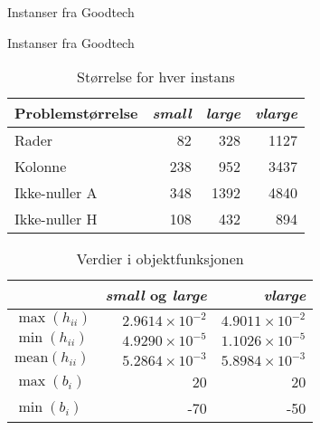 \documentclass{beamer}
\begin{document}
\begin{frame}{Instanser fra Goodtech}

\end{frame}



\begin{frame}{Instanser fra Goodtech}
\begin{table}[ht!]
    \centering
    \caption{Størrelse for hver instans}
    \begin{tabular}{lrrr}
    Problemstørrelse & \textit{small} & \textit{large} & \textit{vlarge} \\\hline
    Rader        & 82             & 328            & 1127 \\
    Kolonne      & 238            & 952            & 3437 \\
    Ikke-nuller A & 348            & 1392           & 4840 \\
    Ikke-nuller H & 108            & 432            & 894 \\
    \end{tabular}
    \label{table:sizes}
\end{table}
\begin{table}[ht!]
    \centering
    \caption{Verdier i objektfunksjonen}

    \begin{tabular}{lrr}
      & \textit{small} og \textit{large}         & \textit{vlarge} \\\hline
    $\max(h_{ii})$      & $2.9614 \times 10^{-2}$ & $4.9011 \times 10^{-2}$ \\
    $\min(h_{ii})$      & $4.9290 \times 10^{-5}$ & $1.1026 \times 10^{-5}$ \\
$\textrm{mean}(h_{ii})$ & $5.2864 \times 10^{-3}$ & $5.8984 \times 10^{-3}$ \\
    $\max(b_{i})$       & 20                      & 20 \\
    $\min(b_{i})$       & -70                     & -50 \\
    \end{tabular}
    \label{table:maxmin}
\end{table}
\end{frame}
\end{document}
